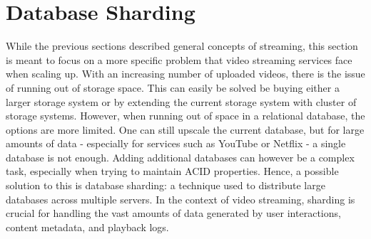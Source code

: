 \begin{table}[h]
    \centering
    \caption{Comparison of In-House Storage, Cloud Storage, and P2P for Video Streaming}
    \label{tab:comparison_storage_delivery}
\end{table}

\section{Database Sharding}
While the previous sections described general concepts of streaming, this section is meant to focus on a more specific problem that video streaming services face when scaling up. 
With an increasing number of uploaded videos, there is the issue of running out of storage space. This can easily be solved be buying either a larger storage system or by extending the current storage system with cluster of storage systems. However, when running out of space in a relational database, the options are more limited. One can still upscale the current database, but for large amounts of data - especially for services such as YouTube or Netflix - a single database is not enough. Adding additional databases can however be a complex task, especially when trying to maintain \ac{ACID} properties. 
Hence, a possible solution to this is database sharding: a technique used to distribute large databases across multiple servers. In the context of video streaming, sharding is crucial for handling the vast amounts of data generated by user interactions, content metadata, and playback logs.

